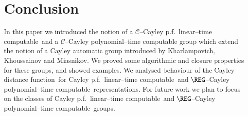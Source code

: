 \documentclass[article,12pt]{elsarticle}
\newcommand\distfun{Cayley distance function}
\newcommand\ClinearC{$\mathcal{C}$--Cayley p.f.~linear--time computable}
\newcommand\linearC{Cayley p.f.~linear--time computable}
\newcommand\polyC{Cayley polynomial--time computable}
\begin{document}
 
\section{Conclusion} 
\label{sec_conclusion}    
In this paper we introduced the notion 
of a %
\ClinearC\ 
and a $\mathcal{C}$--Cayley polynomial--time 
computable group which  extend
the notion of a Cayley automatic group 
introduced by Kharlampovich, Khoussainov and 
Miasnikov. We proved some algorithmic and 
closure properties for these groups, 
and showed examples. 
We analysed behaviour of the \distfun\ for  
\linearC\ and $\REG$--\polyC\ representations.  
For future work we plan to focus  
on the classes of \linearC\ and 
$\REG$--\polyC\ groups.
 




\end{document}
